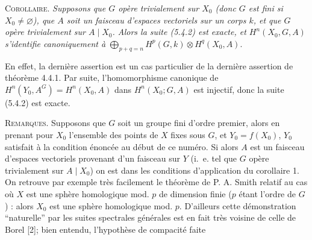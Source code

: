 \textsc{Corollaire.} \textit{Supposons que $G$ opère trivialement sur
$X_0$ (donc $G$ est fini si $X_0\ne\varnothing$), que $A$ soit un faisceau d'espaces vectoriels sur
un corps $k$, et que $G$ opère trivialement sur $A\mathbin{|}X_0$. Alors la
suite \textup{(5.4.2)} est exacte, et $H^n(X_0,G,A)$ s'identifie canoniquement à}
$\displaystyle\bigoplus_{p+q=n}H^p(G,k)\otimes H^q(X_0,A)$.

En effet, la dernière assertion est un cas particulier de la dernière
assertion de théorème 4.4.1. Par suite, l'homomorphisme canonique de
$H^n(Y_0,A^G)=H^n(X_0,A)$ dans $H^n(X_0;G,A)$ est injectif, donc la suite
(5.4.2) est exacte.

\textsc{Remarques.} Supposons que $G$ soit un groupe fini d'ordre
premier, alors en prenant pour $X_0$ l'ensemble des points de $X$ fixes sous
$G$, et $Y_0=f(X_0)$, $Y_0$ satisfait à la condition énoncée au début de ce
numéro. Si alors $A$ est un faisceau d'espaces vectoriels provenant d'un
faisceau sur $Y$ (i.\ e. tel que $G$ opère trivialement sur
$A\mathbin{|}X_0$) on est dans les conditions d'application du corollaire 1.
On retrouve par exemple très facilement le théorème de P. A. Smith relatif au
cas où $X$ est une sphère homologique mod. $p$ de dimension finie ($p$ étant
l'ordre de $G$) : alors $X_0$ est une sphère homologique mod. $p$. D'ailleurs
cette démonstration ``naturelle'' par les suites spectrales générales est en
fait très voisine de celle de Borel [2]; bien entendu, l'hypothèse de
compacité faite

